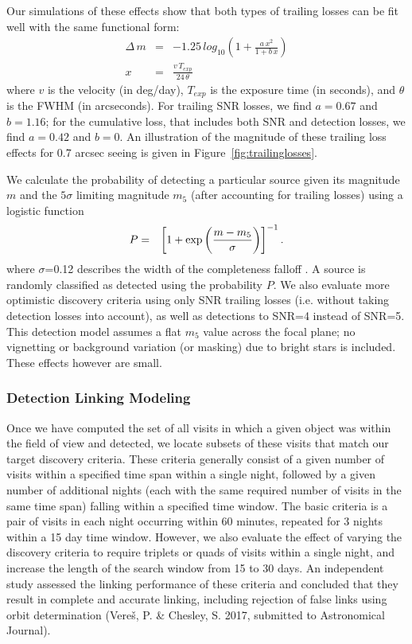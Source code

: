 Our simulations of these effects show that both types of trailing losses can be fit well with the
same functional form:
\begin{eqnarray}
\Delta \, m & = &-1.25 \, log_{10} \left( 1 + \frac{a \, x^2} { 1 + b\,
    x} \right) \\
x & = & \frac{v \, T_{exp}} {24 \, \theta}
\end{eqnarray}
where $v$ is the velocity (in deg/day), $T_{exp}$ is the exposure time (in seconds), and $\theta$ is the FWHM (in arcseconds). For trailing SNR losses, we find $a = 0.67$ and $b = 1.16$; for the cumulative loss, that includes both SNR and detection losses,
we find $a=0.42$ and $b=0$. An illustration of the magnitude of these trailing loss effects for 0.7 arcsec seeing is given in Figure~\ref{fig:trailinglosses}.

We calculate the probability of detecting a particular source given its magnitude $m$
and the $5\sigma$ limiting magnitude $m_5$ (after accounting for trailing losses) using a logistic function
\begin{eqnarray}
     P & = & \left[ 1 +  {\rm exp}\left(\frac {m -  m_5}{\sigma}\right) \right]^{-1}.
\end{eqnarray}
where $\sigma$=0.12 describes the width of the completeness falloff \citep{2014ApJ...794..120A}. A source is randomly classified
as detected using the probability $P$. We also evaluate more optimistic discovery criteria using only SNR trailing losses
(i.e. without taking detection losses into account), as well as detections to SNR=4 instead of SNR=5.  This detection model assumes a flat $m_5$
value across the focal plane; no vignetting or background variation (or masking) due to bright stars is included. These effects however are small.


\subsubsection{Detection Linking Modeling}

Once we have computed the set of all visits in which a given object was within the field of view and detected, we locate subsets of these visits that match our target discovery criteria. These criteria generally consist of a given number of visits within a specified
time span within a single night, followed by a given number of additional nights (each with the same required number
of visits in the same time span) falling within a specified time window. The basic criteria is a pair of visits in each
night occurring within 60 minutes, repeated for 3 nights within a 15 day time window. However, we also evaluate
the effect of varying the discovery criteria to require triplets or quads of visits within a single night, and increase
the length of the search window from 15 to 30 days. An independent study  assessed the linking performance of these 
criteria and concluded that they result in complete and accurate linking, including rejection of false links using orbit determination 
(Vere\v{s}, P. \& Chesley, S. 2017, submitted to Astronomical Journal).


